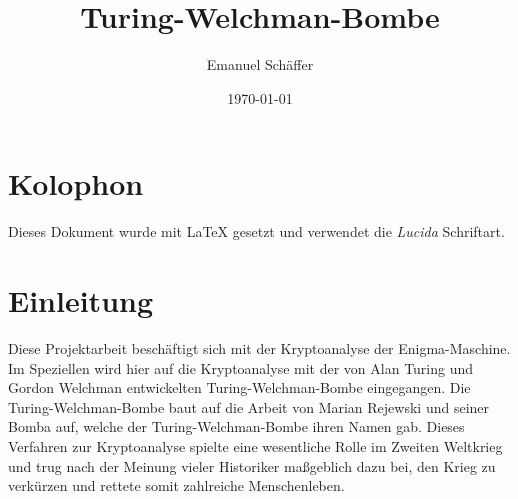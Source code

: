 \documentclass[ngerman, a4paper, footsepline, headsepline]{scrreport}
\begin{document}
	\setcounter{page}{1}
	
	\subject{Projektarbeit zur Kryptoanalyse der Enigma-Maschine durch eine Software-Nachbildung der Turing-Welchman-Bombe\\
	der Fakultät Elektrotechnik und Informatik}
	\title{Turing-Welchman-Bombe}
	\author{Emanuel Schäffer}
	\date{\today}
	\publishers{RWU--University of Applied Sciences \\ Prof. Dipl.-Math. Ekkehard Löhmann}
	\maketitle
	
	\cleardoublepage
	\chapter*{Kolophon}
	Dieses Dokument wurde mit \LaTeX{} gesetzt und verwendet die \textsl{Lucida} Schriftart.
	
	\cleardoublepage
	\tableofcontents
	
	\chapter*{Einleitung}\label{ch:einleitung}
	Diese Projektarbeit beschäftigt sich mit der Kryptoanalyse der Enigma-Maschine.
	Im Speziellen wird hier auf die Kryptoanalyse mit der von Alan Turing und Gordon Welchman entwickelten \glqq Turing-Welchman-Bombe\grqq{} eingegangen.
	Die Turing-Welchman-Bombe baut auf die Arbeit von Marian Rejewski und seiner \glqq Bomba\grqq{} auf, welche der Turing-Welchman-Bombe ihren Namen gab.
	Dieses Verfahren zur Kryptoanalyse spielte eine wesentliche Rolle im Zweiten Weltkrieg und trug nach der Meinung vieler Historiker maßgeblich dazu bei, den Krieg zu verkürzen und rettete somit zahlreiche Menschenleben.
	
	\cleardoublepage
	\setcounter{page}{1}
	
	
	
	
	
	
	
	
	
%	
	
	\newpage
\end{document}
